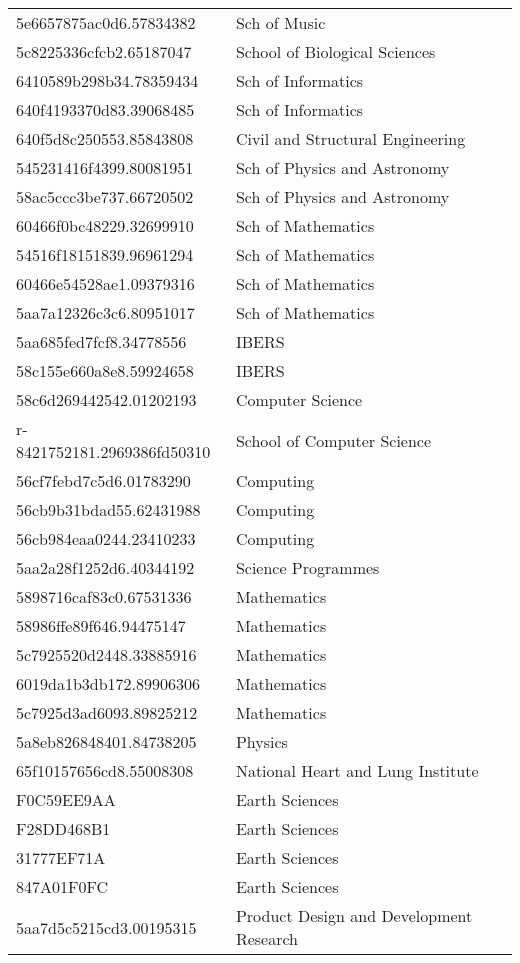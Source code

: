 \begin{tabular}{ll}
5e6657875ac0d6.57834382 & Sch of Music \\
5c8225336cfcb2.65187047 & School of Biological Sciences \\
6410589b298b34.78359434 & Sch of Informatics \\
640f4193370d83.39068485 & Sch of Informatics \\
640f5d8c250553.85843808 & Civil and Structural Engineering \\
545231416f4399.80081951 & Sch of Physics and Astronomy \\
58ac5ccc3be737.66720502 & Sch of Physics and Astronomy \\
60466f0bc48229.32699910 & Sch of Mathematics \\
54516f18151839.96961294 & Sch of Mathematics \\
60466e54528ae1.09379316 & Sch of Mathematics \\
5aa7a12326c3c6.80951017 & Sch of Mathematics \\
5aa685fed7fcf8.34778556 & IBERS \\
58c155e660a8e8.59924658 & IBERS \\
58c6d269442542.01202193 & Computer Science \\
r-8421752181.2969386fd50310 & School of Computer Science \\
56cf7febd7c5d6.01783290 & Computing \\
56cb9b31bdad55.62431988 & Computing \\
56cb984eaa0244.23410233 & Computing \\
5aa2a28f1252d6.40344192 & Science Programmes \\
5898716caf83c0.67531336 & Mathematics \\
58986ffe89f646.94475147 & Mathematics \\
5c7925520d2448.33885916 & Mathematics \\
6019da1b3db172.89906306 & Mathematics \\
5c7925d3ad6093.89825212 & Mathematics \\
5a8eb826848401.84738205 & Physics \\
65f10157656cd8.55008308 & National Heart and Lung Institute \\
F0C59EE9AA & Earth Sciences \\
F28DD468B1 & Earth Sciences \\
31777EF71A & Earth Sciences \\
847A01F0FC & Earth Sciences \\
5aa7d5c5215cd3.00195315 & Product Design and Development Research \\

\end{tabular}
